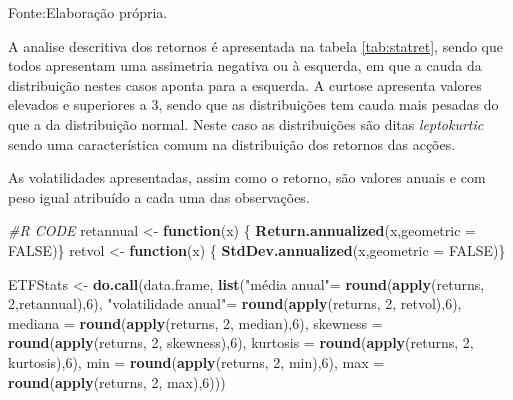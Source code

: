 \documentclass[
  12pt,
  a4paper,
  openany]{book}
\newenvironment{Shaded}{\begin{snugshade}}{\end{snugshade}}
\newcommand{\CommentTok}[1]{\textcolor[rgb]{0.56,0.35,0.01}{\textit{#1}}}
\newcommand{\ControlFlowTok}[1]{\textcolor[rgb]{0.13,0.29,0.53}{\textbf{#1}}}
\newcommand{\DataTypeTok}[1]{\textcolor[rgb]{0.13,0.29,0.53}{#1}}
\newcommand{\DecValTok}[1]{\textcolor[rgb]{0.00,0.00,0.81}{#1}}
\newcommand{\KeywordTok}[1]{\textcolor[rgb]{0.13,0.29,0.53}{\textbf{#1}}}
\newcommand{\NormalTok}[1]{#1}
\newcommand{\OtherTok}[1]{\textcolor[rgb]{0.56,0.35,0.01}{#1}}
\newcommand{\StringTok}[1]{\textcolor[rgb]{0.31,0.60,0.02}{#1}}
\begin{document}
Fonte:Elaboração própria.

\justifying
\bigskip

A analise descritiva dos retornos é apresentada na tabela \ref{tab:statret}, sendo que todos apresentam uma assimetria negativa ou à esquerda, em que a cauda da distribuição nestes casos aponta para a esquerda. A curtose apresenta valores elevados e superiores a 3, sendo que as distribuições tem cauda mais pesadas do que a da distribuição normal. Neste caso as distribuições são ditas \emph{leptokurtic} sendo uma característica comum na distribuição dos retornos das acções.

As volatilidades apresentadas, assim como o retorno, são valores anuais e com peso igual atribuído a cada uma das observações.

\scriptsize

\begin{Shaded}
\begin{Highlighting}[]
\CommentTok{\#R CODE}
\NormalTok{retannual \textless{}{-}}\StringTok{ }\ControlFlowTok{function}\NormalTok{(x) \{  }
  \KeywordTok{Return.annualized}\NormalTok{(x,}\DataTypeTok{geometric =} \OtherTok{FALSE}\NormalTok{)\}}
\NormalTok{retvol \textless{}{-}}\StringTok{ }\ControlFlowTok{function}\NormalTok{(x) \{  }
  \KeywordTok{StdDev.annualized}\NormalTok{(x,}\DataTypeTok{geometric =} \OtherTok{FALSE}\NormalTok{)\}}

\NormalTok{ETFStats \textless{}{-}}\StringTok{ }\KeywordTok{do.call}\NormalTok{(data.frame, }
                    \KeywordTok{list}\NormalTok{(}\StringTok{"média anual"}\NormalTok{=}\StringTok{ }\KeywordTok{round}\NormalTok{(}\KeywordTok{apply}\NormalTok{(returns, }\DecValTok{2}\NormalTok{,retannual),}\DecValTok{6}\NormalTok{),}
                         \StringTok{"volatilidade anual"}\NormalTok{=}\StringTok{ }\KeywordTok{round}\NormalTok{(}\KeywordTok{apply}\NormalTok{(returns, }\DecValTok{2}\NormalTok{, retvol),}\DecValTok{6}\NormalTok{),}
                         \DataTypeTok{mediana =} \KeywordTok{round}\NormalTok{(}\KeywordTok{apply}\NormalTok{(returns, }\DecValTok{2}\NormalTok{, median),}\DecValTok{6}\NormalTok{),}
                         \DataTypeTok{skewness =} \KeywordTok{round}\NormalTok{(}\KeywordTok{apply}\NormalTok{(returns, }\DecValTok{2}\NormalTok{, skewness),}\DecValTok{6}\NormalTok{),}
                         \DataTypeTok{kurtosis =} \KeywordTok{round}\NormalTok{(}\KeywordTok{apply}\NormalTok{(returns, }\DecValTok{2}\NormalTok{, kurtosis),}\DecValTok{6}\NormalTok{),}
                         \DataTypeTok{min =} \KeywordTok{round}\NormalTok{(}\KeywordTok{apply}\NormalTok{(returns, }\DecValTok{2}\NormalTok{, min),}\DecValTok{6}\NormalTok{),}
                         \DataTypeTok{max =} \KeywordTok{round}\NormalTok{(}\KeywordTok{apply}\NormalTok{(returns, }\DecValTok{2}\NormalTok{, max),}\DecValTok{6}\NormalTok{)))}
\end{Highlighting}
\end{Shaded}
\end{document}
